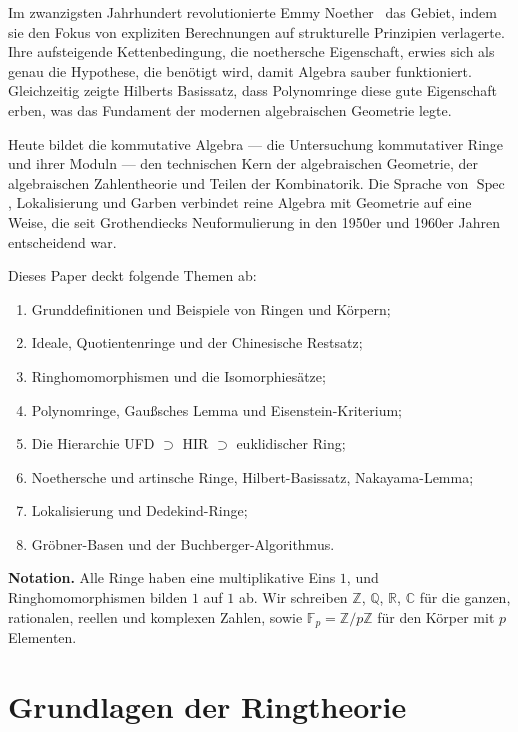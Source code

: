 \documentclass[12pt,a4paper]{amsart}
\theoremstyle{definition}
\theoremstyle{definition}
\DeclareMathOperator{\Spec}{Spec}
\begin{document}
Im zwanzigsten Jahrhundert revolutionierte Emmy Noether~\cite{Noether1921} das Gebiet,
indem sie den Fokus von expliziten Berechnungen auf strukturelle Prinzipien verlagerte.
Ihre aufsteigende Kettenbedingung, die noethersche Eigenschaft, erwies sich als genau
die Hypothese, die benötigt wird, damit Algebra sauber funktioniert. Gleichzeitig zeigte
Hilberts Basissatz, dass Polynomringe diese gute Eigenschaft erben, was das Fundament
der modernen algebraischen Geometrie legte.

Heute bildet die kommutative Algebra --- die Untersuchung kommutativer Ringe und ihrer
Moduln --- den technischen Kern der algebraischen Geometrie, der algebraischen Zahlentheorie
und Teilen der Kombinatorik. Die Sprache von $\Spec$, Lokalisierung und Garben verbindet
reine Algebra mit Geometrie auf eine Weise, die seit Grothendiecks Neuformulierung in
den 1950er und 1960er Jahren entscheidend war.

Dieses Paper deckt folgende Themen ab:
\begin{enumerate}[label=(\roman*)]
  \item Grunddefinitionen und Beispiele von Ringen und Körpern;
  \item Ideale, Quotientenringe und der Chinesische Restsatz;
  \item Ringhomomorphismen und die Isomorphiesätze;
  \item Polynomringe, Gaußsches Lemma und Eisenstein-Kriterium;
  \item Die Hierarchie UFD $\supset$ HIR $\supset$ euklidischer Ring;
  \item Noethersche und artinsche Ringe, Hilbert-Basissatz, Nakayama-Lemma;
  \item Lokalisierung und Dedekind-Ringe;
  \item Gröbner-Basen und der Buchberger-Algorithmus.
\end{enumerate}

\medskip

\noindent\textbf{Notation.} Alle Ringe haben eine multiplikative Eins $1$, und
Ringhomomorphismen bilden $1$ auf $1$ ab. Wir schreiben $\mathbb{Z}$, $\mathbb{Q}$,
$\mathbb{R}$, $\mathbb{C}$ für die ganzen, rationalen, reellen und komplexen Zahlen,
sowie $\mathbb{F}_p = \mathbb{Z}/p\mathbb{Z}$ für den Körper mit $p$ Elementen.

\section{Grundlagen der Ringtheorie}
\end{document}
